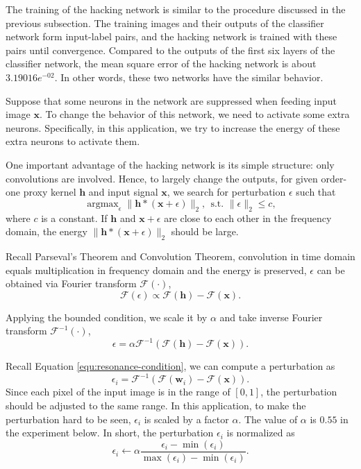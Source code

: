 \documentclass[twoside,11pt]{article}
\newcommand{\syncrecord}[2]{#2} %
\def\tvar#1{\mathbf{#1}} %
\def\argmax{\mathop{\text{argmax}}}
\begin{document}
The training of the hacking network is similar to the procedure discussed in the previous subsection.
The training images and their outputs of the classifier network form input-label pairs, and the hacking network is trained with these pairs until convergence.
Compared to the outputs of the first six layers of the classifier network, the mean square error of the hacking network is about \syncrecord{mnist_hack_err}{\(3.19016e^{-02}\)}. In other words, these two networks have the similar behavior.


Suppose that some neurons in the network are suppressed when feeding input image \(\tvar{x}\).
To change the behavior of this network, we need to activate some extra neurons.
Specifically, in this application, we try to increase the energy of these extra neurons to activate them.


One important advantage of the hacking network is its simple structure: only convolutions are involved. Hence, to largely change the outputs, for given order-one proxy kernel \(\tvar{h}\) and input signal \(\tvar{x}\), we search for perturbation \(\epsilon\) such that
\begin{equation}
  \argmax_{\epsilon} \| \tvar{h} * (\tvar{x} + \epsilon) \|_2, ~~ \text{s.t. } \|\epsilon \|_2 \le c,
\end{equation}
where \(c\) is a constant.
If \(\tvar{h}\) and \(\tvar{x} + \epsilon\) are close to each other in the frequency domain, the energy \(\| \tvar{h} * (\tvar{x} + \epsilon) \|_2\) should be large.

Recall Parseval's Theorem and Convolution Theorem, convolution in time domain equals multiplication in frequency domain and the energy is preserved, \(\epsilon\) can be obtained via Fourier transform \(\mathcal{F}(\cdot)\),
\begin{equation}
  \mathcal{F}(\epsilon) \propto \mathcal{F}(\tvar{h}) - \mathcal{F}(\tvar{x}).
\end{equation}

Applying the bounded condition, we scale it by \(\alpha\) and take inverse Fourier transform \(\mathcal{F}^{-1}(\cdot)\),
\begin{equation}
  \epsilon = \alpha \mathcal{F}^{-1}\left(\mathcal{F}(\tvar{h}) - \mathcal{F}(\tvar{x})\right).
  \label{equ:resonance-condition}
\end{equation}




Recall Equation \ref{equ:resonance-condition}, we can compute a perturbation as
\begin{equation*}
  \epsilon_{i} = \mathcal{F}^{-1} \left(\mathcal{F}(\tvar{w}_{i}) - \mathcal{F}(\tvar{x})\right).
\end{equation*}
Since each pixel of the input image is in the range of \([0, 1]\), the perturbation should be adjusted to the same range. In this application, to make the perturbation hard to be seen, \(\epsilon_i\) is scaled by a factor \(\alpha\).
The value of \(\alpha\) is \(0.55\) in the experiment below.
In short, the perturbation \(\epsilon_i\) is normalized as
\begin{equation*}
  \epsilon_i \leftarrow \alpha \dfrac{\epsilon_i - \min(\epsilon_i)}{\max(\epsilon_i) - \min(\epsilon_i)}.
\end{equation*}
\end{document}
